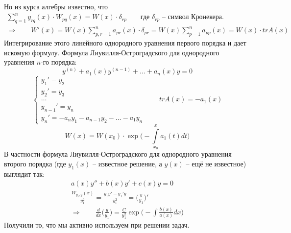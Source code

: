 Но из курса алгебры известно, что
\begin{align*}
    \sum\limits_{q=1}^{n}y_{rq}(x)\cdot W_{pq}(x) = W(x)\cdot\delta_{rp} \qquad \text{где $\delta_{rp}$ -- символ Кронекера.} \\
    \Rightarrow \qquad W'(x) = W(x) \sum\limits_{p,r=1}^{n}a_{pr}(x)\cdot \delta_{pr} = W(x)\sum\limits_{p=1}^{n}a_{pp}(x) = W(x)\cdot trA(x)
\end{align*}
Интегрирование этого линейного однородного уравнения первого порядка
и дает искомую формулу. \EndProof
\newpage
Формула Лиувилля-Остроградского для однородного уравнения $n$-го порядка:
\begin{equation*}
    y^{(n)} + a_1(x)y^{(n-1)} + \ldots + a_n(x)y = 0
\end{equation*}
\begin{equation*}
 \begin{cases}
   y_1'=y_2\\
   y_2'=y_3\\
   \ldots\\
   y_{n-1}'=y_n\\
   y_n'=-a_ny_1-a_{n-1}y_2-\ldots -a_1y_n
 \end{cases}
 \qquad trA(x) = -a_1(x)
\end{equation*}
\begin{equation*}
    W(x)=W(x_0)\cdot\exp{\Big(-\int\limits_{x_0}^xa_1(t)dt\Big)}
\end{equation*}
\bigbreak
\Example В частности формула Лиувилля-Остроградского для однородного уравнения второго порядка (где $y_1(x)$ -- известное решение, а $y(x)$ -- ещё не известное) выглядит так:
\begin{align*}
    a(x)y''+b(x)y'+c(x)y=0\\
    \frac{W_{y_1,y}(x)}{y_1^2}=\frac{y_1y' - y_1'y}{y_1^2} = \Big(\frac{y}{y_1}\Big)'\\
    \Rightarrow \qquad \frac{d}{dx}\Big(\frac{y}{y_1}\Big) = \frac{C}{y_1^2}\exp{\Big(-\int \frac{b(x)}{a(x)}dx\Big)}
\end{align*}
Получили то, что мы активно используем при решении задач.